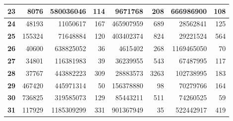 \documentclass[12pt]{article}
\begin{document}
\begin{table}[!htbp]
{\begin{tabular}{crrrrrrr}
\multicolumn{1}{|c|}{\textbf{23}} & \multicolumn{1}{r|}{8076} & \multicolumn{1}{r|}{580036046} & \multicolumn{1}{r|}{114} & \multicolumn{1}{r|}{9671768} & \multicolumn{1}{r|}{208} & \multicolumn{1}{r|}{666986900} & \multicolumn{1}{r|}{108} \\ \hline
\multicolumn{1}{|c|}{\textbf{24}} & \multicolumn{1}{r|}{48193} & \multicolumn{1}{r|}{11050617} & \multicolumn{1}{r|}{167} & \multicolumn{1}{r|}{465907959} & \multicolumn{1}{r|}{689} & \multicolumn{1}{r|}{28562841} & \multicolumn{1}{r|}{125} \\ \hline
\multicolumn{1}{|c|}{\textbf{25}} & \multicolumn{1}{r|}{155324} & \multicolumn{1}{r|}{71648884} & \multicolumn{1}{r|}{120} & \multicolumn{1}{r|}{403402374} & \multicolumn{1}{r|}{824} & \multicolumn{1}{r|}{29221524} & \multicolumn{1}{r|}{564} \\ \hline
\multicolumn{1}{|c|}{\textbf{26}} & \multicolumn{1}{r|}{40600} & \multicolumn{1}{r|}{638825052} & \multicolumn{1}{r|}{36} & \multicolumn{1}{r|}{4615402} & \multicolumn{1}{r|}{268} & \multicolumn{1}{r|}{1169465050} & \multicolumn{1}{r|}{70} \\ \hline
\multicolumn{1}{|c|}{\textbf{27}} & \multicolumn{1}{r|}{34801} & \multicolumn{1}{r|}{116381983} & \multicolumn{1}{r|}{39} & \multicolumn{1}{r|}{36239955} & \multicolumn{1}{r|}{543} & \multicolumn{1}{r|}{67487995} & \multicolumn{1}{r|}{117} \\ \hline
\multicolumn{1}{|c|}{\textbf{28}} & \multicolumn{1}{r|}{37767} & \multicolumn{1}{r|}{443882223} & \multicolumn{1}{r|}{309} & \multicolumn{1}{r|}{28883573} & \multicolumn{1}{r|}{3263} & \multicolumn{1}{r|}{102738995} & \multicolumn{1}{r|}{183} \\ \hline
\multicolumn{1}{|c|}{\textbf{29}} & \multicolumn{1}{r|}{467420} & \multicolumn{1}{r|}{445971314} & \multicolumn{1}{r|}{50} & \multicolumn{1}{r|}{156378880} & \multicolumn{1}{r|}{98} & \multicolumn{1}{r|}{70279766} & \multicolumn{1}{r|}{164} \\ \hline
\multicolumn{1}{|c|}{\textbf{30}} & \multicolumn{1}{r|}{736825} & \multicolumn{1}{r|}{319585073} & \multicolumn{1}{r|}{129} & \multicolumn{1}{r|}{85443211} & \multicolumn{1}{r|}{511} & \multicolumn{1}{r|}{74260525} & \multicolumn{1}{r|}{59} \\ \hline
\multicolumn{1}{|c|}{\textbf{31}} & \multicolumn{1}{r|}{117929} & \multicolumn{1}{r|}{1185309299} & \multicolumn{1}{r|}{331} & \multicolumn{1}{r|}{901367949} & \multicolumn{1}{r|}{35} & \multicolumn{1}{r|}{522442917} & \multicolumn{1}{r|}{419} \\ \hline

\end{tabular}}
\end{table}
\end{document}
